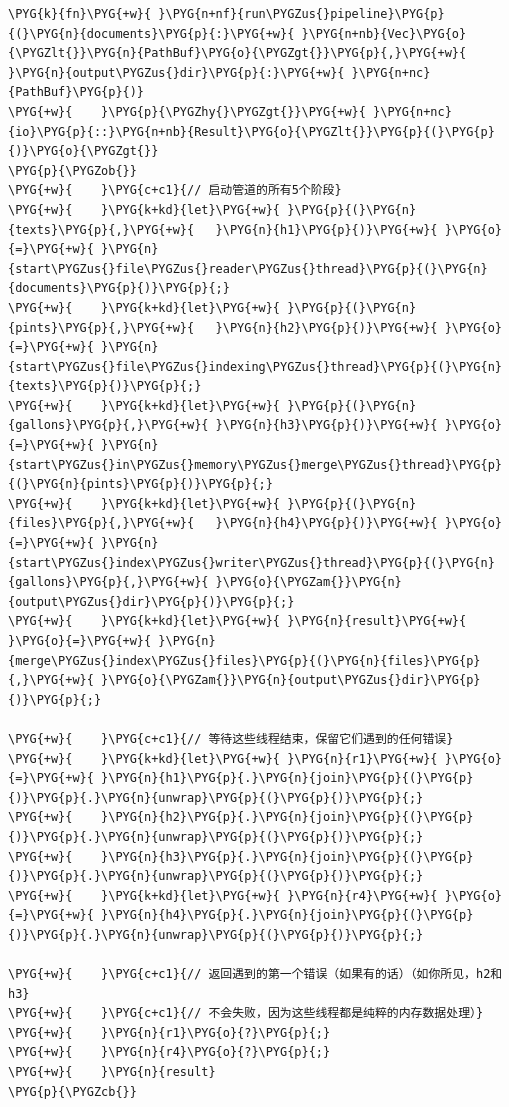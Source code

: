 \begin{Verbatim}[commandchars=\\\{\},breaklines=true,breakanywhere=true,fontsize=\codefont,xleftmargin=17bp]
\PYG{k}{fn}\PYG{+w}{ }\PYG{n+nf}{run\PYGZus{}pipeline}\PYG{p}{(}\PYG{n}{documents}\PYG{p}{:}\PYG{+w}{ }\PYG{n+nb}{Vec}\PYG{o}{\PYGZlt{}}\PYG{n}{PathBuf}\PYG{o}{\PYGZgt{}}\PYG{p}{,}\PYG{+w}{ }\PYG{n}{output\PYGZus{}dir}\PYG{p}{:}\PYG{+w}{ }\PYG{n+nc}{PathBuf}\PYG{p}{)}
\PYG{+w}{    }\PYG{p}{\PYGZhy{}\PYGZgt{}}\PYG{+w}{ }\PYG{n+nc}{io}\PYG{p}{::}\PYG{n+nb}{Result}\PYG{o}{\PYGZlt{}}\PYG{p}{(}\PYG{p}{)}\PYG{o}{\PYGZgt{}}
\PYG{p}{\PYGZob{}}
\PYG{+w}{    }\PYG{c+c1}{// 启动管道的所有5个阶段}
\PYG{+w}{    }\PYG{k+kd}{let}\PYG{+w}{ }\PYG{p}{(}\PYG{n}{texts}\PYG{p}{,}\PYG{+w}{   }\PYG{n}{h1}\PYG{p}{)}\PYG{+w}{ }\PYG{o}{=}\PYG{+w}{ }\PYG{n}{start\PYGZus{}file\PYGZus{}reader\PYGZus{}thread}\PYG{p}{(}\PYG{n}{documents}\PYG{p}{)}\PYG{p}{;}
\PYG{+w}{    }\PYG{k+kd}{let}\PYG{+w}{ }\PYG{p}{(}\PYG{n}{pints}\PYG{p}{,}\PYG{+w}{   }\PYG{n}{h2}\PYG{p}{)}\PYG{+w}{ }\PYG{o}{=}\PYG{+w}{ }\PYG{n}{start\PYGZus{}file\PYGZus{}indexing\PYGZus{}thread}\PYG{p}{(}\PYG{n}{texts}\PYG{p}{)}\PYG{p}{;}
\PYG{+w}{    }\PYG{k+kd}{let}\PYG{+w}{ }\PYG{p}{(}\PYG{n}{gallons}\PYG{p}{,}\PYG{+w}{ }\PYG{n}{h3}\PYG{p}{)}\PYG{+w}{ }\PYG{o}{=}\PYG{+w}{ }\PYG{n}{start\PYGZus{}in\PYGZus{}memory\PYGZus{}merge\PYGZus{}thread}\PYG{p}{(}\PYG{n}{pints}\PYG{p}{)}\PYG{p}{;}
\PYG{+w}{    }\PYG{k+kd}{let}\PYG{+w}{ }\PYG{p}{(}\PYG{n}{files}\PYG{p}{,}\PYG{+w}{   }\PYG{n}{h4}\PYG{p}{)}\PYG{+w}{ }\PYG{o}{=}\PYG{+w}{ }\PYG{n}{start\PYGZus{}index\PYGZus{}writer\PYGZus{}thread}\PYG{p}{(}\PYG{n}{gallons}\PYG{p}{,}\PYG{+w}{ }\PYG{o}{\PYGZam{}}\PYG{n}{output\PYGZus{}dir}\PYG{p}{)}\PYG{p}{;}
\PYG{+w}{    }\PYG{k+kd}{let}\PYG{+w}{ }\PYG{n}{result}\PYG{+w}{ }\PYG{o}{=}\PYG{+w}{ }\PYG{n}{merge\PYGZus{}index\PYGZus{}files}\PYG{p}{(}\PYG{n}{files}\PYG{p}{,}\PYG{+w}{ }\PYG{o}{\PYGZam{}}\PYG{n}{output\PYGZus{}dir}\PYG{p}{)}\PYG{p}{;}

\PYG{+w}{    }\PYG{c+c1}{// 等待这些线程结束，保留它们遇到的任何错误}
\PYG{+w}{    }\PYG{k+kd}{let}\PYG{+w}{ }\PYG{n}{r1}\PYG{+w}{ }\PYG{o}{=}\PYG{+w}{ }\PYG{n}{h1}\PYG{p}{.}\PYG{n}{join}\PYG{p}{(}\PYG{p}{)}\PYG{p}{.}\PYG{n}{unwrap}\PYG{p}{(}\PYG{p}{)}\PYG{p}{;}
\PYG{+w}{    }\PYG{n}{h2}\PYG{p}{.}\PYG{n}{join}\PYG{p}{(}\PYG{p}{)}\PYG{p}{.}\PYG{n}{unwrap}\PYG{p}{(}\PYG{p}{)}\PYG{p}{;}
\PYG{+w}{    }\PYG{n}{h3}\PYG{p}{.}\PYG{n}{join}\PYG{p}{(}\PYG{p}{)}\PYG{p}{.}\PYG{n}{unwrap}\PYG{p}{(}\PYG{p}{)}\PYG{p}{;}
\PYG{+w}{    }\PYG{k+kd}{let}\PYG{+w}{ }\PYG{n}{r4}\PYG{+w}{ }\PYG{o}{=}\PYG{+w}{ }\PYG{n}{h4}\PYG{p}{.}\PYG{n}{join}\PYG{p}{(}\PYG{p}{)}\PYG{p}{.}\PYG{n}{unwrap}\PYG{p}{(}\PYG{p}{)}\PYG{p}{;}

\PYG{+w}{    }\PYG{c+c1}{// 返回遇到的第一个错误（如果有的话）（如你所见，h2和h3}
\PYG{+w}{    }\PYG{c+c1}{// 不会失败，因为这些线程都是纯粹的内存数据处理）}
\PYG{+w}{    }\PYG{n}{r1}\PYG{o}{?}\PYG{p}{;}
\PYG{+w}{    }\PYG{n}{r4}\PYG{o}{?}\PYG{p}{;}
\PYG{+w}{    }\PYG{n}{result}
\PYG{p}{\PYGZcb{}}
\end{Verbatim}

